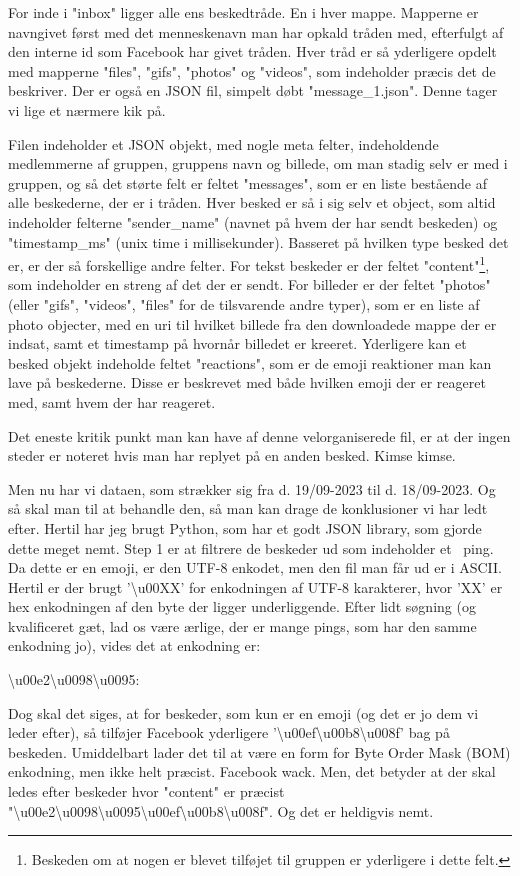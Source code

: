 \documentclass{article}
\newlength\myheight
\newlength\mydepth
\newcommand*\inlinegraphics[1]{%
  \settototalheight\myheight{Xygp}%
  \settodepth\mydepth{Xygp}%
  \raisebox{-\mydepth}{\texttt{[image: \#1]}}%
}
\newcommand{\coffee}[0]{\inlinegraphics{coffee.png}}
\begin{document}
For inde i "inbox" ligger alle ens beskedtråde. En i hver mappe. Mapperne er navngivet først med det menneskenavn man har opkald tråden med, efterfulgt af den interne id som Facebook har givet tråden. Hver tråd er så yderligere opdelt med mapperne "files", "gifs", "photos" og "videos", som indeholder præcis det de beskriver. Der er også en JSON fil, simpelt døbt "message\_1.json". Denne tager vi lige et nærmere kik på.

Filen indeholder et JSON objekt, med nogle meta felter, indeholdende medlemmerne af gruppen, gruppens navn og billede, om man stadig selv er med i gruppen, og så det størte felt er feltet "messages", som er en liste bestående af alle beskederne, der er i tråden. Hver besked er så i sig selv et object, som altid indeholder felterne "sender\_name" (navnet på hvem der har sendt beskeden) og "timestamp\_ms" (unix time i millisekunder). Basseret på hvilken type besked det er, er der så forskellige andre felter. For tekst beskeder er der feltet "content"\footnote{Beskeden om at nogen er blevet tilføjet til gruppen er yderligere i dette felt.}, som indeholder en streng af det der er sendt. For billeder er der feltet "photos" (eller "gifs", "videos", "files" for de tilsvarende andre typer), som er en liste af photo objecter, med en uri til hvilket billede fra den downloadede mappe der er indsat, samt et timestamp på hvornår billedet er kreeret.
Yderligere kan et besked objekt indeholde feltet "reactions", som er de emoji reaktioner man kan lave på beskederne. Disse er beskrevet med både hvilken emoji der er reageret med, samt hvem der har reageret.

Det eneste kritik punkt man kan have af denne velorganiserede fil, er at der ingen steder er noteret hvis man har replyet på en anden besked. Kimse kimse.

Men nu har vi dataen, som strækker sig fra d. 19/09-2023 til d. 18/09-2023. Og så skal man til at behandle den, så man kan drage de konklusioner vi har ledt efter. Hertil har jeg brugt Python, som har et godt JSON library, som gjorde dette meget nemt. Step 1 er at filtrere de beskeder ud som indeholder et \coffee\ ping. Da dette er en emoji, er den UTF-8 enkodet, men den fil man får ud er i ASCII. Hertil er der brugt '\textbackslash u00XX' for enkodningen af UTF-8 karakterer, hvor 'XX' er hex enkodningen af den byte der ligger underliggende. Efter lidt søgning (og kvalificeret gæt, lad os være ærlige, der er mange pings, som har den samme enkodning jo), vides det at enkodning er:
\begin{center}
\textbackslash u00e2\textbackslash u0098\textbackslash u0095: \coffee
\end{center}
Dog skal det siges, at for beskeder, som kun er en emoji (og det er jo dem vi leder efter), så tilføjer Facebook yderligere '\textbackslash u00ef\textbackslash u00b8\textbackslash u008f' bag på beskeden. Umiddelbart lader det til at være en form for Byte Order Mask (BOM) enkodning, men ikke helt præcist. Facebook wack. Men, det betyder at der skal ledes efter beskeder hvor "content" er præcist "\textbackslash u00e2\textbackslash u0098\textbackslash u0095\textbackslash u00ef\textbackslash u00b8\textbackslash u008f". Og det er heldigvis nemt.
\end{document}
